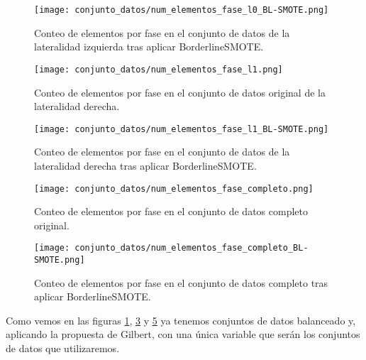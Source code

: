 \begin{figure}[H]
    \centering
     \texttt{[image: conjunto\_datos/num\_elementos\_fase\_l0\_BL-SMOTE.png]}
     \label{fig:l0-over}
    \caption{Conteo de elementos por fase en el conjunto de datos de la lateralidad izquierda tras aplicar BorderlineSMOTE.}
\end{figure}

\begin{figure}[H]
    \centering
	  \texttt{[image: conjunto\_datos/num\_elementos\_fase\_l1.png]}
     \label{fig:l1-orig}
    \caption{Conteo de elementos por fase en el conjunto de datos original de la lateralidad derecha.}

\end{figure}

\begin{figure}[H]
    \centering
     \texttt{[image: conjunto\_datos/num\_elementos\_fase\_l1\_BL-SMOTE.png]}
     \label{fig:l1-over}
    \caption{Conteo de elementos por fase en el conjunto de datos de la lateralidad derecha tras aplicar BorderlineSMOTE.}
\end{figure}



\begin{figure}[H]
    \centering
	  \texttt{[image: conjunto\_datos/num\_elementos\_fase\_completo.png]}
     \label{fig:completo-orig}
    \caption{Conteo de elementos por fase en el conjunto de datos completo original.}

\end{figure}

\begin{figure}[H]
    \centering
     \texttt{[image: conjunto\_datos/num\_elementos\_fase\_completo\_BL-SMOTE.png]}
     \label{fig:completo-over}
    \caption{Conteo de elementos por fase en el conjunto de datos completo tras aplicar BorderlineSMOTE.}
\end{figure}


Como vemos en las figuras \ref{fig:l0-over}, \ref{fig:l1-over} y \ref{fig:completo-over} ya tenemos conjuntos de datos balanceado y, aplicando la propuesta de Gilbert, con una única variable que serán los conjuntos de datos que utilizaremos.
